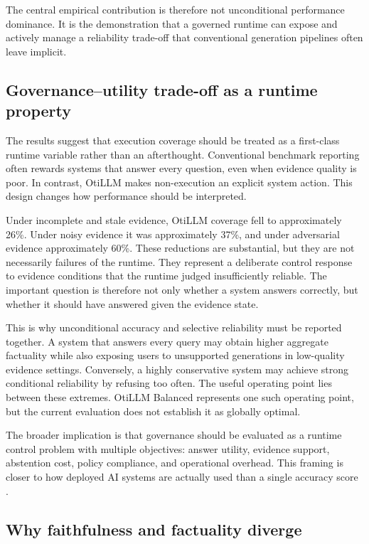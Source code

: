 \documentclass[manuscript, screen, review]{jair}
\begin{document}
The central empirical contribution is therefore not unconditional performance dominance. It is the demonstration that a governed runtime can expose and actively manage a reliability trade-off that conventional generation pipelines often leave implicit.

\subsection{Governance–utility trade-off as a runtime property}

The results suggest that execution coverage should be treated as a first-class runtime variable rather than an afterthought. Conventional benchmark reporting often rewards systems that answer every question, even when evidence quality is poor. In contrast, OtiLLM makes non-execution an explicit system action. This design changes how performance should be interpreted.

Under incomplete and stale evidence, OtiLLM coverage fell to approximately 26\%. Under noisy evidence it was approximately 37\%, and under adversarial evidence approximately 60\%. These reductions are substantial, but they are not necessarily failures of the runtime. They represent a deliberate control response to evidence conditions that the runtime judged insufficiently reliable. The important question is therefore not only whether a system answers correctly, but whether it should have answered given the evidence state.

This is why unconditional accuracy and selective reliability must be reported together. A system that answers every query may obtain higher aggregate factuality while also exposing users to unsupported generations in low-quality evidence settings. Conversely, a highly conservative system may achieve strong conditional reliability by refusing too often. The useful operating point lies between these extremes. OtiLLM Balanced represents one such operating point, but the current evaluation does not establish it as globally optimal.

The broader implication is that governance should be evaluated as a runtime control problem with multiple objectives: answer utility, evidence support, abstention cost, policy compliance, and operational overhead. This framing is closer to how deployed AI systems are actually used than a single accuracy score \citep{kamath2020selective}.

\subsection{Why faithfulness and factuality diverge}
\end{document}
